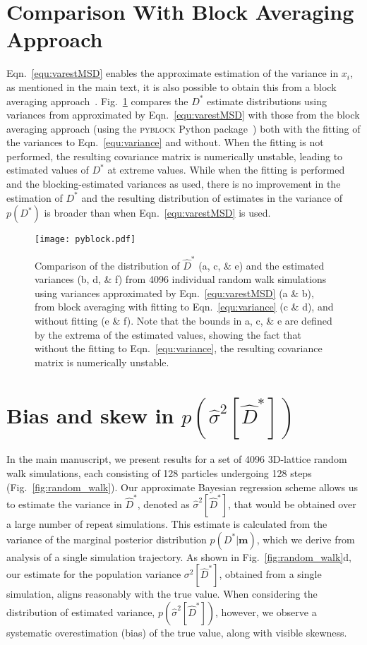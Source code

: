 \documentclass[reprint,superscriptaddress,nobibnotes,amsmath,amssymb,aps,prx,hidelinks,linenumbers]{revtex4-2}
\newcommand{\oMSDi}{\ensuremath{x_i}}
\newcommand{\model}{\bm{m}}
\newcommand{\prob}[1]{\ensuremath{p(#1)}}
\newcommand{\Dest}{\ensuremath{\widehat{D}^*}}
\newcommand{\D}{\ensuremath{D^*}}
\newcommand{\var}[1]{\ensuremath{\sigma^2[#1]}}
\newcommand{\varest}[1]{\ensuremath{\widehat{\sigma}^2[#1]}}
\begin{document}
\section{Comparison With Block Averaging Approach}
\label{sec:block}
Eqn.~\ref{equ:varestMSD} enables the approximate estimation of the variance in $\oMSDi$, as mentioned in the main text, it is also possible to obtain this from a block averaging approach~\cite{flyvbjerg_error_1989,frenkel_understanding_2023}.
Fig.~\ref{fig:pyblock} compares the $\D$ estimate distributions using variances from approximated by Eqn.~\ref{equ:varestMSD} with those from the block averaging approach (using the \textsc{pyblock} Python package~\cite{spencer_pyblock_2020}) both with the fitting of the variances to Eqn.~\ref{equ:variance} and without.
When the fitting is not performed, the resulting covariance matrix is numerically unstable, leading to estimated values of $\D$ at extreme values.
While when the fitting is performed and the blocking-estimated variances as used, there is no improvement in the estimation of $\D$ and the resulting distribution of estimates in the variance of $\prob{\D}$ is broader than when Eqn.~\ref{equ:varestMSD} is used.

\begin{figure}
    \centering
    \texttt{[image: pyblock.pdf]}
    \caption{Comparison of the distribution of $\Dest$ (a, c, \& e) and the estimated variances (b, d, \& f) from 4096 individual random walk simulations using variances approximated by Eqn.~\ref{equ:varestMSD} (a \& b), from block averaging with fitting to Eqn.~\ref{equ:variance} (c \& d), and without fitting (e \& f). Note that the bounds in a, c, \& e are defined by the extrema of the estimated values, showing the fact that without the fitting to Eqn.~\ref{equ:variance}, the resulting covariance matrix is numerically unstable.}
    \label{fig:pyblock}
\end{figure}

\section{Bias and skew in $\prob{\varest{\Dest}}$}
\label{sec:skew}
In the main manuscript, we present results for a set of \num{4096} 3D-lattice random walk simulations, each consisting of \num{128} particles undergoing \num{128} steps (Fig.~\ref{fig:random_walk}).
Our approximate Bayesian regression scheme allows us to estimate the variance in $\Dest$, denoted as $\varest{\Dest}$, that would be obtained over a large number of repeat simulations.
This estimate is calculated from the variance of the marginal posterior distribution $\prob{\D|\model}$, which we derive from analysis of a single simulation trajectory.
As shown in Fig.~\ref{fig:random_walk}d, our estimate for the population variance $\var{\Dest}$, obtained from a single simulation, aligns reasonably with the true value.
When considering the distribution of estimated variance, $\prob{\varest{\Dest}}$, however, we observe a systematic overestimation (bias) of the true value, along with visible skewness.
\end{document}
